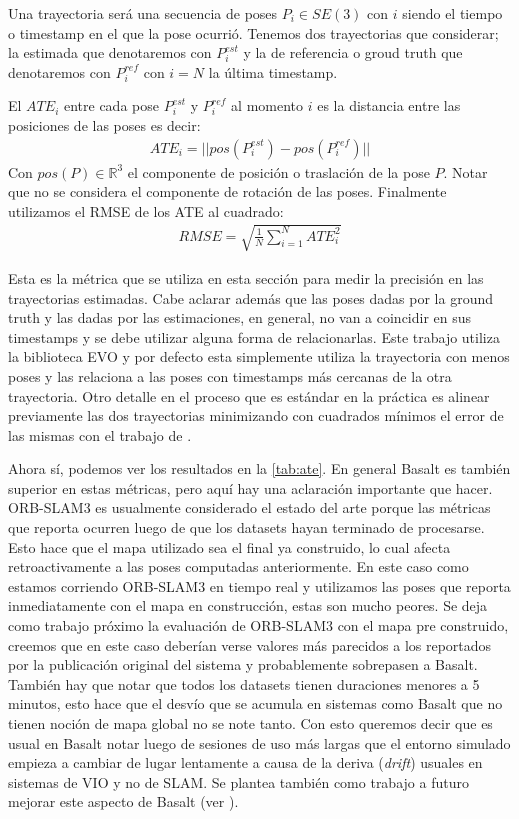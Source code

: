 \documentclass[ twoside,openright,titlepage,numbers=noenddot,%
                headinclude,footinclude,cleardoublepage=empty,abstract=on,
                BCOR=-5mm,paper=a4,fontsize=11pt
                ]{scrreprt}
\newcommand{\R}{\mathbb{R}}
\begin{document}
Una trayectoria será una secuencia de poses \(P_i \in SE(3)\) con \(i\)
siendo el tiempo o timestamp en el que la pose ocurrió. Tenemos dos
trayectorias que considerar; la estimada que denotaremos con
\(P^{est}_i\) y la de referencia o groud truth que denotaremos con
\(P^{ref}_i\) con \(i=N\) la última timestamp.

El \(ATE_i\) entre cada pose \(P^{est}_i\) y \(P^{ref}_i\) al momento
\(i\) es la distancia entre las posiciones de las poses es decir:
\begin{align}
ATE_i = ||pos(P^{est}_i) - pos(P^{ref}_i)||
\end{align} Con \(pos(P) \in \R^3\) el componente de posición o
traslación de la pose \(P\). Notar que no se considera el componente de
rotación de las poses. Finalmente utilizamos el RMSE de los ATE al
cuadrado: \begin{align}
RMSE = \sqrt{\frac{1}{N} \sum_{i=1}^{N} ATE_i^2}
\end{align}

Esta es la métrica que se utiliza en esta sección para medir la
precisión en las trayectorias estimadas. Cabe aclarar además que las
poses dadas por la ground truth y las dadas por las estimaciones, en
general, no van a coincidir en sus timestamps y se debe utilizar alguna
forma de relacionarlas. Este trabajo utiliza la biblioteca EVO
\autocite{grupp2017evo} y por defecto esta simplemente utiliza la
trayectoria con menos poses y las relaciona a las poses con timestamps
más cercanas de la otra trayectoria. Otro detalle en el proceso que es
estándar en la práctica es alinear previamente las dos trayectorias
minimizando con cuadrados mínimos el error de las mismas con el trabajo
de \textcite{umeyamaLeastsquaresEstimationTransformation1991}.

Ahora sí, podemos ver los resultados en la \autoref{tab:ate}. En general
Basalt es también superior en estas métricas, pero aquí hay una
aclaración importante que hacer. ORB-SLAM3 es usualmente considerado el
estado del arte porque las métricas que reporta ocurren luego de que los
datasets hayan terminado de procesarse. Esto hace que el mapa utilizado
sea el final ya construido, lo cual afecta retroactivamente a las poses
computadas anteriormente. En este caso como estamos corriendo ORB-SLAM3
en tiempo real y utilizamos las poses que reporta inmediatamente con el
mapa en construcción, estas son mucho peores. Se deja como trabajo
próximo la evaluación de ORB-SLAM3 con el mapa pre construido, creemos
que en este caso deberían verse valores más parecidos a los reportados
por la publicación original del sistema y probablemente sobrepasen a
Basalt. También hay que notar que todos los datasets tienen duraciones
menores a 5 minutos, esto hace que el desvío que se acumula en sistemas
como Basalt que no tienen noción de mapa global no se note tanto. Con
esto queremos decir que es usual en Basalt notar luego de sesiones de
uso más largas que el entorno simulado empieza a cambiar de lugar
lentamente a causa de la deriva (\emph{drift}) usuales en sistemas de
VIO y no de SLAM. Se plantea también como trabajo a futuro mejorar este
aspecto de Basalt (ver ).
\end{document}
